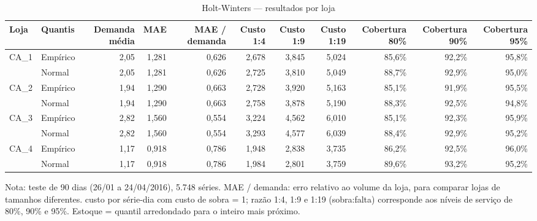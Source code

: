 \begin{table}[htbp]
\centering
\small
\caption{Holt-Winters — resultados por loja}
\label{tab:hw_por_loja}
\begin{tabular}{llrrrrrrrrr}
\toprule
Loja & Quantis & Demanda média & MAE & MAE / demanda & Custo 1:4 & Custo 1:9 & Custo 1:19 & Cobertura 80\% & Cobertura 90\% & Cobertura 95\% \\
\midrule
CA\_1 & Empírico & 2,05 & 1,281 & 0,626 & 2,678 & 3,845 & 5,024 & 85,6\% & 92,2\% & 95,8\% \\
 & Normal & 2,05 & 1,281 & 0,626 & 2,725 & 3,810 & 5,049 & 88,7\% & 92,9\% & 95,0\% \\
\addlinespace
CA\_2 & Empírico & 1,94 & 1,290 & 0,663 & 2,728 & 3,920 & 5,163 & 85,1\% & 91,9\% & 95,5\% \\
 & Normal & 1,94 & 1,290 & 0,663 & 2,758 & 3,878 & 5,190 & 88,3\% & 92,5\% & 94,8\% \\
\addlinespace
CA\_3 & Empírico & 2,82 & 1,560 & 0,554 & 3,224 & 4,562 & 6,010 & 85,1\% & 92,3\% & 95,9\% \\
 & Normal & 2,82 & 1,560 & 0,554 & 3,293 & 4,577 & 6,039 & 88,4\% & 92,9\% & 95,2\% \\
\addlinespace
CA\_4 & Empírico & 1,17 & 0,918 & 0,786 & 1,948 & 2,838 & 3,735 & 86,2\% & 92,5\% & 96,0\% \\
 & Normal & 1,17 & 0,918 & 0,786 & 1,984 & 2,801 & 3,759 & 89,6\% & 93,2\% & 95,2\% \\
\bottomrule
\end{tabular}
\par\smallskip
{\footnotesize Nota: teste de 90 dias (26/01 a 24/04/2016), 5.748 séries. MAE / demanda: erro relativo ao volume da loja, para comparar lojas de tamanhos diferentes. custo por série-dia com custo de sobra = 1; razão 1:4, 1:9 e 1:19 (sobra:falta) corresponde aos níveis de serviço de 80\%, 90\% e 95\%. Estoque = quantil arredondado para o inteiro mais próximo.}
\end{table}
